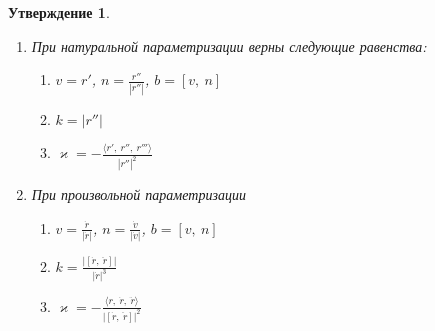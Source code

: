 \documentclass[12pt]{article}
\newcommand\tab[1][.5cm]{\hspace*{#1}}
\theoremstyle{plain}
\newtheorem{subtheorem}{Утверждение}[section]
\begin{document}
    \begin{subtheorem}\tab
        \begin{enumerate}
            \item При натуральной параметризации верны следующие равенства:
            \begin{enumerate}
                \item $v=r'$, $n=\frac{r''}{|r''|}$, $b=[v, \ n]$
                \item $k=|r''|$
                \item $\varkappa=-\frac{\langle r', \ r'', \ r''' \rangle}{|r''|^2}$
            \end{enumerate}
            \item При произвольной параметризации \begin{enumerate}
                \item $v=\frac{\dot{r}}{|\dot{r}|}$, $n=\frac{\dot{v}}{|\dot{v}|}$, $b=[v, \ n]$
                \item $k=\frac{|[\dot{r}, \ \ddot{r}]|}{|\dot{r}|^3}$
                \item $\varkappa=-\frac{\langle r, \ \dot{r}, \ \ddot{r} \rangle}{|[\dot{r}, \ \ddot{r}]|^2}$
            \end{enumerate}
        \end{enumerate}
    \end{subtheorem}
\end{document}
